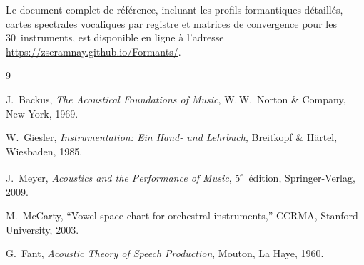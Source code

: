 \documentclass[11pt,a4paper]{article}
\begin{document}
Le document complet de référence, incluant les profils formantiques
détaillés, cartes spectrales vocaliques par registre et matrices de
convergence pour les 30~instruments, est disponible en ligne à l'adresse
\url{https://zseramnay.github.io/Formants/}.


\begin{thebibliography}{9}

  J.~Backus,
  \textit{The Acoustical Foundations of Music},
  W.\,W.~Norton \& Company, New York, 1969.

  W.~Giesler,
  \textit{Instrumentation: Ein Hand- und Lehrbuch},
  Breitkopf \& Härtel, Wiesbaden, 1985.

  J.~Meyer,
  \textit{Acoustics and the Performance of Music},
  5\textsuperscript{e}~édition, Springer-Verlag, 2009.

  M.~McCarty,
  ``Vowel space chart for orchestral instruments,''
  CCRMA, Stanford University, 2003.

  G.~Fant,
  \textit{Acoustic Theory of Speech Production},
  Mouton, La Haye, 1960.

\end{thebibliography}
\end{document}
